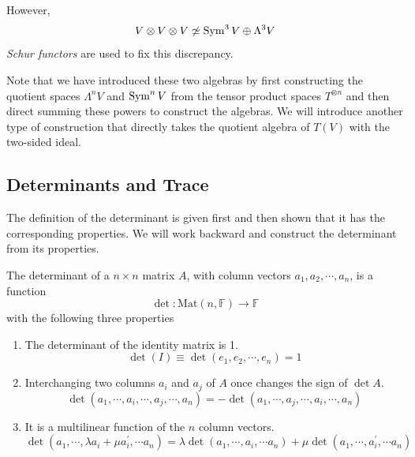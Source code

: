   However, 
  \[V \otimes V \otimes V \not\simeq \operatorname{Sym}^3 V \oplus \Lambda^3 V\]
  \textit{Schur functors} are used to fix this discrepancy. 

  Note that we have introduced these two algebras by first constructing the quotient spaces $\Lambda^n V$ and $\operatorname{Sym} ^n V$ from the tensor product spaces $T^{\otimes n}$ and then direct summing these powers to construct the algebras. We will introduce another type of construction that directly takes the quotient algebra of $T(V)$ with the two-sided ideal. 

\subsection{Determinants and Trace}

  The definition of the determinant is given first and then shown that it has the corresponding properties. We will work backward and construct the determinant from its properties. 

  \begin{definition}[Determinant]
    The determinant of a $n \times n$ matrix $A$, with column vectors $a_1, a_2, \cdots, a_n$, is a function
    \begin{equation}
      \det: \text{Mat}(n, \mathbb{F}) \longrightarrow \mathbb{F}
    \end{equation}
    with the following three properties
    \begin{enumerate}
      \item The determinant of the identity matrix is 1. 
      \begin{equation}
        \det{(I)} \equiv \det{(e_1, e_2, \cdots, e_n)} = 1
      \end{equation}
      \item Interchanging two columns $a_i$ and $a_j$ of $A$ once changes the sign of $\det{A}$. 
      \begin{equation}
        \det{(a_1, \cdots, a_i, \cdots, a_j, \cdots, a_n)} = -\det{(a_1, \cdots, a_j, \cdots, a_i, \cdots, a_n)}
      \end{equation}
      \item It is a multilinear function of the $n$ column vectors. 
      \begin{equation}
        \det{(a_1, \cdots, \lambda a_i + \mu a_i^\prime, \cdots a_n)} = \lambda \det{(a_1, \cdots, a_i, \cdots a_n)} + \mu \det{(a_1, \cdots, a_i^\prime, \cdots a_n)}
      \end{equation}
    \end{enumerate}
  \end{definition}

